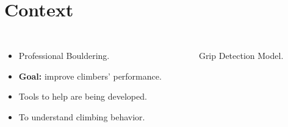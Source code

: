 \section{Context}


\begin{frame}
    \begin{columns}
        
        \vspace{1em}
        
        \begin{itemize}
            \itemsep1em
            \item Professional Bouldering.
            \item \textbf{Goal:} improve climbers' performance.
            \item Tools to help are being developed.
            \item To understand climbing behavior.
        \end{itemize}

        \begin{figure}[!t]
            \centering
            \caption{Grip Detection Model.}
            \label{figure:path-tracking}
            \cite{boulanger2025automatic}
        \end{figure}
    \end{columns}

\end{frame}

